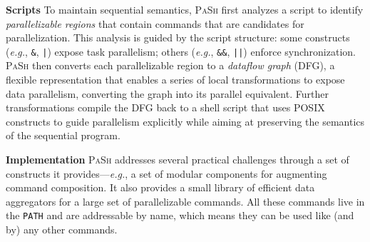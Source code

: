 \documentclass[sigplan, review, screen, anonymous]{acmart}
\newcommand{\eg}{{\em e.g.}, }
\newcommand{\heading}[1]{\vspace{4pt}\noindent\textbf{#1}\enspace}
\newcommand{\ttt}[1]{\texttt{#1}}
\newcommand{\kk}[1]{[{\color{magenta}kk: #1}]}
\newcommand{\sys}{{\scshape PaSh}\xspace}
\begin{document}
\heading{Scripts}
To maintain sequential semantics, \sys first analyzes a script to identify \emph{parallelizable regions} that contain commands that are candidates for parallelization.
This analysis is guided by the script structure: %
  some constructs (\eg \ttt{&}, \ttt{|}) expose task parallelism; others (\eg \ttt{&&}, \ttt{||}) enforce synchronization.
\sys then converts each parallelizable region to a \emph{dataflow graph} (DFG), 
  a flexible representation that enables a series of local transformations to expose data parallelism, converting the graph into its parallel equivalent.
Further transformations compile the DFG back to a shell script that uses POSIX constructs to guide parallelism explicitly while aiming at preserving the semantics of the sequential program.

\heading{Implementation}
\sys addresses several practical challenges through a set of constructs it provides---\eg a set of
modular components for augmenting command composition.
It also provides a small library of efficient data aggregators for a large set of parallelizable commands.
All these commands live in the \ttt{PATH} and are addressable by name, which means they can be used like (and by) any other commands.
\end{document}
